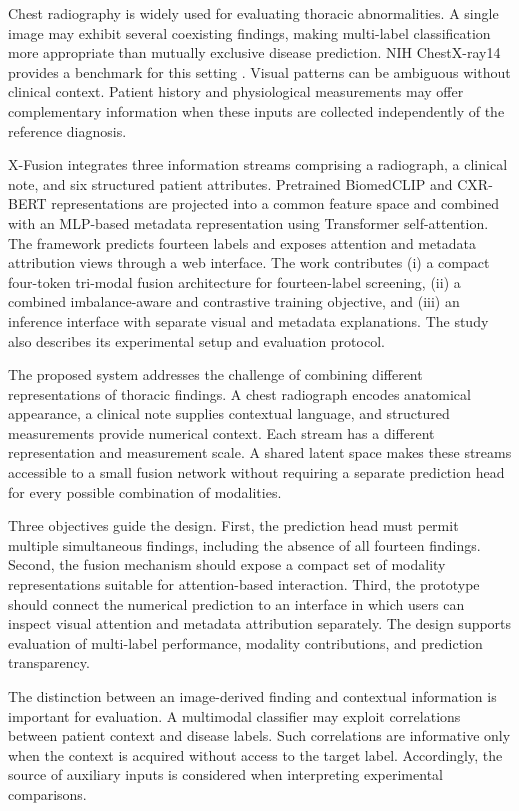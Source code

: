 \documentclass[pdflatex,sn-mathphys-num]{sn-jnl}
\begin{document}
Chest radiography is widely used for evaluating thoracic abnormalities. A single image may exhibit several coexisting findings, making multi-label classification more appropriate than mutually exclusive disease prediction. NIH ChestX-ray14 provides a benchmark for this setting \cite{wang2017,nihdataset}. Visual patterns can be ambiguous without clinical context. Patient history and physiological measurements may offer complementary information when these inputs are collected independently of the reference diagnosis.

X-Fusion integrates three information streams comprising a radiograph, a clinical note, and six structured patient attributes. Pretrained BiomedCLIP and CXR-BERT representations are projected into a common feature space and combined with an MLP-based metadata representation using Transformer self-attention. The framework predicts fourteen labels and exposes attention and metadata attribution views through a web interface. The work contributes (i) a compact four-token tri-modal fusion architecture for fourteen-label screening, (ii) a combined imbalance-aware and contrastive training objective, and (iii) an inference interface with separate visual and metadata explanations. The study also describes its experimental setup and evaluation protocol.



The proposed system addresses the challenge of combining different representations of thoracic findings. A chest radiograph encodes anatomical appearance, a clinical note supplies contextual language, and structured measurements provide numerical context. Each stream has a different representation and measurement scale. A shared latent space makes these streams accessible to a small fusion network without requiring a separate prediction head for every possible combination of modalities.

Three objectives guide the design. First, the prediction head must permit multiple simultaneous findings, including the absence of all fourteen findings. Second, the fusion mechanism should expose a compact set of modality representations suitable for attention-based interaction. Third, the prototype should connect the numerical prediction to an interface in which users can inspect visual attention and metadata attribution separately. The design supports evaluation of multi-label performance, modality contributions, and prediction transparency.

The distinction between an image-derived finding and contextual information is important for evaluation. A multimodal classifier may exploit correlations between patient context and disease labels. Such correlations are informative only when the context is acquired without access to the target label. Accordingly, the source of auxiliary inputs is considered when interpreting experimental comparisons.
\end{document}

